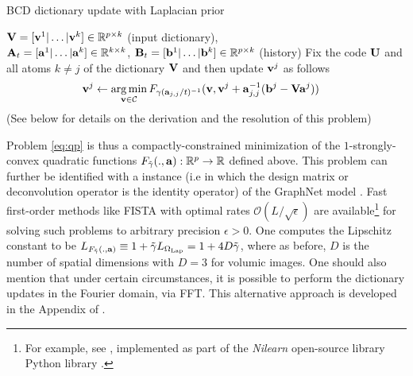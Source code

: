 \begin{algorithm}
\caption{BCD dictionary update with Laplacian prior}
\label{Tab:algo_sobdict}
\begin{algorithmic}[1]
\REQUIRE $\mathbf{V} = [\mathbf{v}^1|\ldots|\mathbf{v}^k] \in \mathbb{R}^{p \times k}$ (input
dictionary),\\
$\mathbf{A}_t = [\mathbf{a}^1|\ldots|\mathbf{a}^k] \in \mathbb R^{k \times k}$, $\mathbf{B}_t =
[\mathbf{b}^1|\ldots|\mathbf{b}^k] \in \mathbb R^{p \times k}$ (history)
\STATE Fix the code $\mathbf{U}$ and all atoms $k \ne j$ of the
dictionary $\mathbf{V}$ and then update $\mathbf{v}^j$ as follows
\begin{eqnarray}
  \begin{split}
    \mathbf{v}^j &\leftarrow \operatorname*{arg\,min}_{\mathbf{v} \in \mathcal C}F_{\gamma (\mathbf{a}_{j,j}/t)^{-1}}(\mathbf{v}, \mathbf{v}^j + \mathbf{a}_{j,j}^{-1}(\mathbf{b}^j - \mathbf{V}\mathbf{a}^j))
  \end{split}
\label{eq:v_sob}
\end{eqnarray}
\hspace{1.6cm}(See below for details on the derivation and the resolution of this problem)
\ENDFOR
\ENDWHILE
\end{algorithmic}
\end{algorithm}
Problem \eqref{eq:qp} is thus a compactly-constrained minimization of the $1$-strongly-convex quadratic functions $F_{\tilde{\gamma}}(.,\mathbf{a}): \mathbb R^p \rightarrow \mathbb R$ defined above. 
%
This problem can further be identified with a  instance
(i.e in which the design matrix or deconvolution operator is the
identity operator) of the GraphNet model
 \cite{grosenick2013,hebiri2011}.
%
Fast first-order methods like FISTA \cite{beck09fista} with optimal rates $\mathcal{O}(L/\sqrt{\epsilon})$ are available\footnote{For example, see  \cite{dohmatob2014benchmarking,varoquaux2015faasta}, implemented as part of the \textit{Nilearn} open-source library Python library  \cite{nilearn}.} for solving such problems to arbitrary precision $\epsilon > 0$.
One computes the Lipschitz constant to be
$L_{F_{\tilde{\gamma}}(.,\mathbf{a})} \equiv 1 + \tilde{\gamma} L_{\Omega_{\text{Lap}}} = 1 + 4D\tilde{\gamma}$, where as before, $D$ is the number of spatial dimensions with $D=3$ for volumic images. One should also mention that under certain circumstances, it is possible to perform the dictionary updates in the Fourier domain, via FFT. This alternative approach is developed in the Appendix of  \cite{dohmatob2016}.


